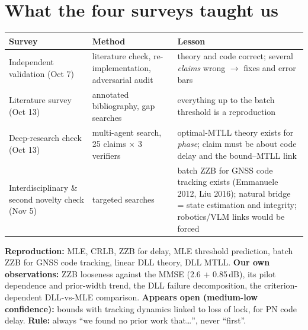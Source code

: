 \documentclass[11pt,a4paper]{article}
\begin{document}
\section{What the four surveys taught us}\label{sec:surveys}
\begin{center}
\begin{tabularx}{\textwidth}{>{\raggedright\arraybackslash}p{3.4cm}>{\raggedright\arraybackslash}p{4.0cm}>{\raggedright\arraybackslash}X}
\toprule
\textbf{Survey} & \textbf{Method} & \textbf{Lesson}\\
\midrule
01 Independent validation (Oct 7) & literature check, re-implementation, adversarial audit & theory and code correct; several \emph{claims} wrong $\to$ fixes and error bars\\
02 Literature survey (Oct 13) & annotated bibliography, gap searches & everything up to the batch threshold is a reproduction\\
03 Deep-research check (Oct 13) & multi-agent search, 25 claims $\times$ 3 verifiers & optimal-MTLL theory exists for \emph{phase}; claim must be about code delay and the bound--MTLL link\\
04 Interdisciplinary \& second novelty check (Nov 5) & targeted searches & batch ZZB for GNSS code tracking exists (Emmanuele 2012, Liu 2016); natural bridge = state estimation and integrity; robotics/VLM links would be forced\\
\bottomrule
\end{tabularx}
\end{center}
\begin{resultbox}
\textbf{Reproduction:} MLE, CRLB, ZZB for delay, MLE threshold prediction, batch ZZB for GNSS code tracking, linear DLL theory,
DLL MTLL. \textbf{Our own observations:} ZZB looseness against the MMSE (2.6 + 0.85\,dB), its pilot dependence and prior-width
trend, the DLL failure decomposition, the criterion-dependent DLL-vs-MLE comparison. \textbf{Appears open (medium-low
confidence):} bounds with tracking dynamics linked to loss of lock, for PN code delay. \textbf{Rule:} always ``we found no prior
work that\ldots'', never ``first''.
\end{resultbox}

\end{document}
